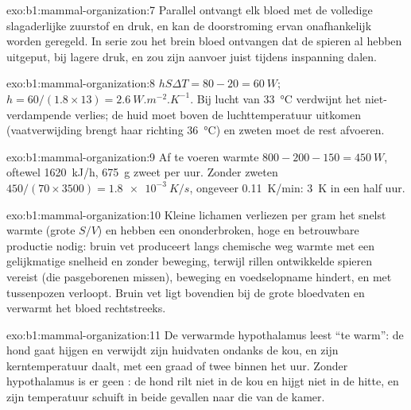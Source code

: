 \begin{solution}{exo:b1:mammal-organization:7}
Parallel ontvangt elk  bloed met de volledige slagaderlijke zuurstof en
druk, en kan de doorstroming ervan onafhankelijk worden geregeld. In serie zou
het brein bloed ontvangen dat de spieren al hebben uitgeput, bij lagere druk,
en zou zijn aanvoer juist tijdens inspanning dalen.
\end{solution}

\begin{solution}{exo:b1:mammal-organization:8}
$hS\Delta T = 80 - 20 = \qty{60}{W}$; $h = 60/(1.8\times 13) =
\qty{2.6}{W.m^{-2}.K^{-1}}$. Bij lucht van \qty{33}{\celsius} verdwijnt het
niet-verdampende verlies; de huid moet boven de luchttemperatuur uitkomen
(vaatverwijding brengt haar richting \qty{36}{\celsius}) en zweten moet de rest
afvoeren.
\end{solution}

\begin{solution}{exo:b1:mammal-organization:9}
Af te voeren warmte $800 - 200 - 150 = \qty{450}{W}$, oftewel \qty{1620}{kJ/h},
\qty{675}{g} zweet per uur. Zonder zweten $450/(70\times 3500) =
\qty{1.8e-3}{K/s}$, ongeveer \qty{0.11}{K/min}: \qty{3}{K} in een half uur.
\end{solution}

\begin{solution}{exo:b1:mammal-organization:10}
Kleine lichamen verliezen per gram het snelst warmte (grote $S/V$) en hebben
een ononderbroken, hoge en betrouwbare productie nodig: bruin vet produceert
langs chemische weg warmte met een gelijkmatige snelheid en zonder beweging,
terwijl rillen ontwikkelde spieren vereist (die pasgeborenen missen), beweging
en voedselopname hindert, en met tussenpozen verloopt. Bruin vet ligt bovendien
bij de grote bloedvaten en verwarmt het bloed rechtstreeks.
\end{solution}

\begin{solution}{exo:b1:mammal-organization:11}
De verwarmde hypothalamus leest ``te warm'': de hond gaat hijgen en verwijdt
zijn huidvaten ondanks de kou, en zijn kerntemperatuur daalt, met een graad of
twee binnen het uur. Zonder hypothalamus is er geen : de hond rilt
niet in de kou en hijgt niet in de hitte, en zijn temperatuur schuift in beide
gevallen naar die van de kamer.
\end{solution}

